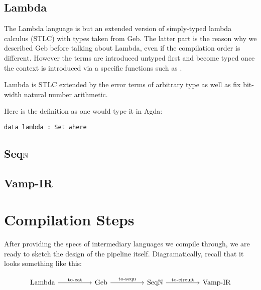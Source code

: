 \subsection{Lambda}

The Lambda language is but an extended version of simply-typed lambda calculus (STLC) with types taken from Geb. The latter part is the reason why we described Geb before talking about Lambda, even if the compilation order is different. However the terms are introduced untyped first and become typed once the context is introduced via a specific functions such as .
\begin{definition}
    Lambda is STLC extended by the error terms \lamerr of arbitrary type as well as fix bit-width natural number arithmetic.
\end{definition}

Here is the definition as one would type it in Agda:

\begin{verbatim}
data lambda : Set where

\end{verbatim}

\subsection{Seq$\mathbb{N}$}

\subsection{Vamp-IR}

\section{Compilation Steps}

After providing the specs of intermediary languages we compile through, we are ready to sketch the design of the pipeline itself. Diagramatically, recall that it looks something like this:

\[\begin{tikzcd}
	{\text{Lambda}} && {\text{Geb}} && {\text{Seq$\N$} } && {\text{Vamp-IR}}
	\arrow["{\text{to-cat}}", from=1-1, to=1-3]
	\arrow["{\text{to-seqn}}", from=1-3, to=1-5]
	\arrow["{\text{to-circuit}}", from=1-5, to=1-7]
\end{tikzcd}\]

